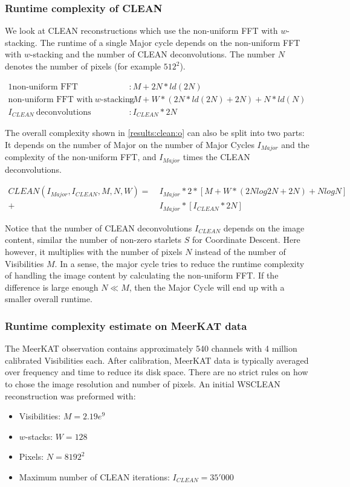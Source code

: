 \subsubsection{Runtime complexity of CLEAN}
We look at CLEAN reconstructions which use the non-uniform FFT with $w$-stacking. The runtime of a single Major cycle depends on the non-uniform FFT with $w$-stacking and the number of CLEAN deconvolutions. The number $N$ denotes the number of pixels (for example $512^2$).

\begin{alignat*}{1}
	\text{non-uniform FFT} &: M + 2N*ld(2N)\\
	\text{non-uniform FFT with} \:w\text{-stacking} &:M + W*(2N*ld(2N) + 2N) + N*ld(N)\\
	I_{CLEAN}\: \text{deconvolutions} &: I_{CLEAN}*2N
\end{alignat*}

The overall complexity shown in \eqref{results:clean:o} can also be split into two parts: It depends on the number of Major on the number of Major Cycles $I_{Major}$ and the complexity of the non-uniform FFT, and $I_{Major}$ times the CLEAN deconvolutions. 

\begin{equation}\label{results:clean:o}
\begin{aligned}
 CLEAN(I_{Major}, I_{CLEAN}, M, N,  W) =\: &I_{Major} * 2 * [M + W*(2N log 2N + 2N) + N log N]\\
+ &I_{Major} * [I_{CLEAN}*2N]
\end{aligned}
\end{equation}

Notice that the number of CLEAN deconvolutions $I_{CLEAN}$ depends on the image content, similar the number of non-zero starlets $S$ for Coordinate Descent. Here however, it multiplies with the number of pixels $N$ instead of the number of Visibilities $M$. In a sense, the major cycle tries to reduce the runtime complexity of handling the image content by calculating the non-uniform FFT. If the difference is large enough $N \ll M$, then the Major Cycle will end up with a smaller overall runtime.

\subsubsection{Runtime complexity estimate on MeerKAT data}
The MeerKAT observation contains approximately 540 channels with 4 million calibrated Visibilities each. After calibration, MeerKAT data is typically averaged over frequency and time to reduce its disk space. There are no strict rules on how to chose the image resolution and number of pixels. An initial WSCLEAN reconstruction was preformed with:
\begin{itemize}
	\item Visibilities: $M=2.19e^9$
	\item $w$-stacks: $W = 128$
	\item Pixels: $N = 8192^2$
	\item Maximum number of CLEAN iterations: $I_{CLEAN} = 35'000$
\end{itemize}

